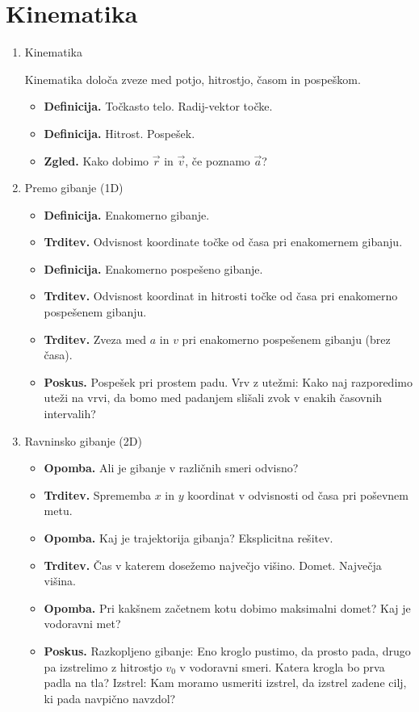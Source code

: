\section{Kinematika}

\begin{enumerate}
    \item Kinematika
    
    Kinematika določa zveze med potjo, hitrostjo, časom in pospeškom.
    \begin{itemize}
        \item \textbf{Definicija.} Točkasto telo. Radij-vektor točke.
        \item \textbf{Definicija.} Hitrost. Pospešek.
        \item \textbf{Zgled.} Kako dobimo \(\vec{r}\) in \(\vec{v}\), če poznamo \(\vec{a}\)?
    \end{itemize}

    \item Premo gibanje (1D)
    \begin{itemize}
        \item \textbf{Definicija.} Enakomerno gibanje.
        \item \textbf{Trditev.} Odvisnost koordinate točke od časa pri enakomernem gibanju.
        \item \textbf{Definicija.} Enakomerno pospešeno gibanje.
        \item \textbf{Trditev.} Odvisnost koordinat in hitrosti točke od časa pri enakomerno pospešenem gibanju.
        \item \textbf{Trditev.} Zveza med \(a\) in \(v\) pri enakomerno pospešenem gibanju (brez časa).
        \item \textbf{Poskus.} Pospešek pri prostem padu. Vrv z utežmi: Kako naj razporedimo uteži na vrvi, da bomo med padanjem slišali zvok v enakih časovnih intervalih?
    \end{itemize}

    \item Ravninsko gibanje (2D)
    \begin{itemize}
        \item \textbf{Opomba.} Ali je gibanje v različnih smeri odvisno? 
        \item \textbf{Trditev.} Sprememba \(x\) in \(y\) koordinat v odvisnosti od časa pri poševnem metu.
        \item \textbf{Opomba.} Kaj je trajektorija gibanja? Eksplicitna rešitev.
        \item \textbf{Trditev.} Čas v katerem dosežemo največjo višino. Domet. Največja višina.
        \item \textbf{Opomba.} Pri kakšnem začetnem kotu dobimo maksimalni domet? Kaj je vodoravni met?
        \item \textbf{Poskus.} Razkopljeno gibanje: Eno kroglo pustimo, da prosto pada, drugo pa izstrelimo z hitrostjo \(v_0\) v vodoravni smeri. Katera krogla bo prva padla na tla? Izstrel: Kam moramo usmeriti izstrel, da izstrel zadene cilj, ki pada navpično navzdol?
    \end{itemize}
\end{enumerate}

